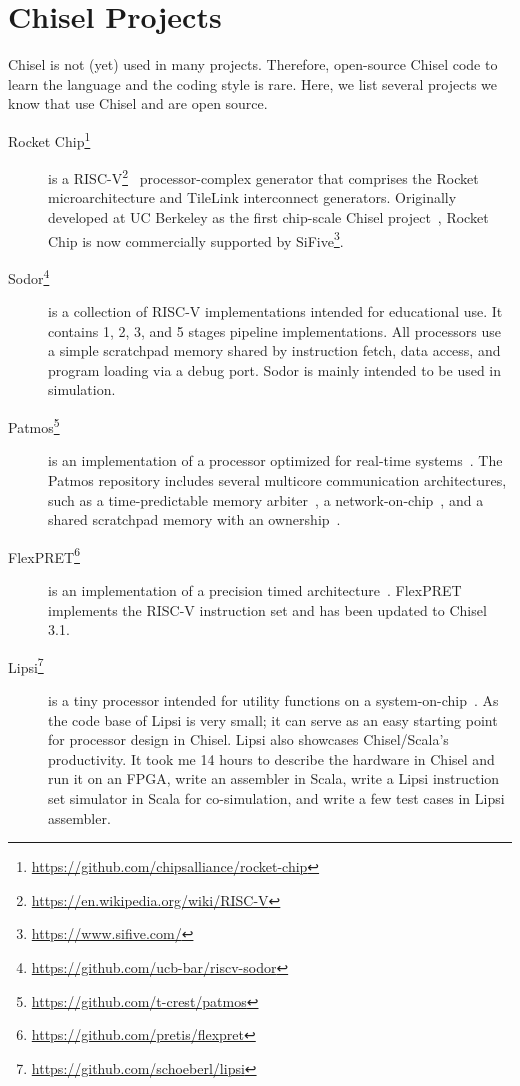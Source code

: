 \documentclass[%
    10pt,
    headinclude, footexclude,
    openright, %
    notitlepage,
    cleardoubleempty,
    headsepline,
    pointlessnumbers,
    bibtotoc, idxtotoc,
    ]{scrbook}
\newcommand{\myref}[2]{\href{#1}{#2}}
\renewcommand{\myref}[2]{{#2}{\footnote{\url{#1}}}}
\begin{document}
\chapter{Chisel Projects}


Chisel is not (yet) used in many projects. Therefore, open-source Chisel code
to learn the language and the coding style is rare. Here, we list several projects
we know that use Chisel and are open source.

\begin{description}

\item[\myref{https://github.com/chipsalliance/rocket-chip}{Rocket Chip}]
is a \myref{https://en.wikipedia.org/wiki/RISC-V}{RISC-V}~\cite{risc-v}
processor-complex generator that comprises the Rocket
microarchitecture and TileLink interconnect generators.  Originally developed
at UC Berkeley as the first chip-scale Chisel project~\cite{rocket:techrep}, Rocket Chip is now
commercially supported by \myref{https://www.sifive.com/}{SiFive}.

\item[\myref{https://github.com/ucb-bar/riscv-sodor}{Sodor}] is a collection of RISC-V
implementations intended for educational use. It contains 1, 2, 3, and 5 stages pipeline
implementations. All processors use a simple scratchpad memory shared by instruction
fetch, data access, and program loading via a debug port. Sodor is mainly intended to
be used in simulation.

\item[\myref{https://github.com/t-crest/patmos}{Patmos}] is an implementation of a
processor optimized for real-time systems~\cite{patmos:rts2018}. The Patmos repository
includes several multicore communication architectures, such as a time-predictable memory
arbiter~\cite{t-crest:memnoc}, a network-on-chip~\cite{s4nocni:arcs2019}, and
a shared scratchpad memory with an ownership~\cite{t-crest:ownspm}.

\item[\myref{https://github.com/pretis/flexpret}{FlexPRET}] is an implementation of a
precision timed architecture~\cite{Zimmer:EECS-2015-181}. FlexPRET implements
the RISC-V instruction set and has been updated to Chisel 3.1.

\item[\myref{https://github.com/schoeberl/lipsi}{Lipsi}] is a tiny processor intended
for utility functions on a system-on-chip~\cite{lipsi:arcs2018}. As the code base of
Lipsi is very small; it can serve as an easy starting point for processor design in Chisel.
Lipsi also showcases Chisel/Scala's productivity. It took me 14 hours to describe the
hardware in Chisel and run it on an FPGA, write an assembler in Scala, write a
Lipsi instruction set simulator in Scala for co-simulation, and write a few test cases
in Lipsi assembler.



\end{description}
\end{document}
